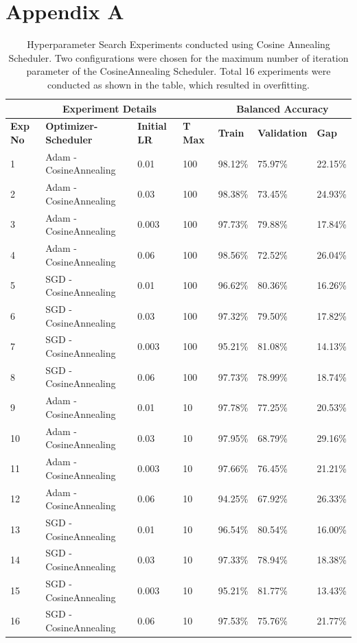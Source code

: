 \documentclass{report} %
\begin{document}
\chapter*{Appendix A} %
\label{appendix}
\begin{table}[h]
\caption[Hyperparameter search experiments conducted using cosine annealing scheduler]{Hyperparameter Search Experiments conducted using Cosine Annealing Scheduler. Two configurations were chosen for the maximum number of iteration parameter of the CosineAnnealing Scheduler. Total 16 experiments were conducted as shown in the table, which resulted in overfitting.}
\label{table:cosineannealing-tmax}
\begin{center}
\small
\begin{tabular}{lllllll}
\multicolumn{4}{c}{\bf{Experiment Details}} & \multicolumn{3}{c}{\bf{Balanced Accuracy}} \\
\hline
\bf{Exp No} & \bf{Optimizer-Scheduler} & \bf{Initial LR} & \bf{T Max} & \bf{Train} & \bf{Validation} & \bf{Gap} \\
\hline
1 & Adam - CosineAnnealing & 0.01 & 100 & 98.12\% & 75.97\% & 22.15\% \\
2 & Adam - CosineAnnealing & 0.03 & 100 & 98.38\% & 73.45\% & 24.93\% \\
3 & Adam - CosineAnnealing & 0.003 & 100 & 97.73\% & 79.88\% & 17.84\% \\
4 & Adam - CosineAnnealing & 0.06 & 100 & 98.56\% & 72.52\% & 26.04\% \\
5 & SGD - CosineAnnealing & 0.01 & 100 & 96.62\% & 80.36\% & 16.26\% \\
6 & SGD - CosineAnnealing & 0.03 & 100 & 97.32\% & 79.50\% & 17.82\% \\
7 & SGD - CosineAnnealing & 0.003 & 100 & 95.21\% & 81.08\% & 14.13\% \\
8 & SGD - CosineAnnealing & 0.06 & 100 & 97.73\% & 78.99\% & 18.74\% \\
9 & Adam - CosineAnnealing & 0.01 & 10 & 97.78\% & 77.25\% & 20.53\% \\
10 & Adam - CosineAnnealing & 0.03 & 10 & 97.95\% & 68.79\% & 29.16\% \\
11 & Adam - CosineAnnealing & 0.003 & 10 & 97.66\% & 76.45\% & 21.21\% \\
12 & Adam - CosineAnnealing & 0.06 & 10 & 94.25\% & 67.92\% & 26.33\% \\
13 & SGD - CosineAnnealing & 0.01 & 10 & 96.54\% & 80.54\% & 16.00\% \\
14 & SGD - CosineAnnealing & 0.03 & 10 & 97.33\% & 78.94\% & 18.38\% \\
15 & SGD - CosineAnnealing & 0.003 & 10 & 95.21\% & 81.77\% & 13.43\% \\
16 & SGD - CosineAnnealing & 0.06 & 10 & 97.53\% & 75.76\% & 21.77\% \\
\hline
\end{tabular}
\end{center}
\end{table}
\end{document}
